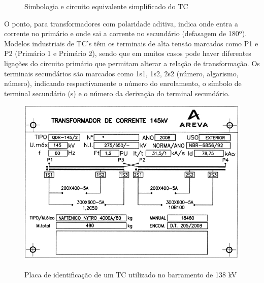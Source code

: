 \documentclass[a5paper]{ufsc-thesis}
\begin{document}
\begin{figure}[htb]
  \caption{Simbologia e circuito equivalente simplificado do TC}
  \label{fig:tca}
  \centering
\end{figure}\par
O ponto, para transformadores com polaridade aditiva, indica onde entra a corrente no primário e onde sai a corrente no secundário (defasagem de 180º). Modelos industriais de TC’s têm os terminais de alta tensão marcados como P1 e P2 (Primário 1 e Primário 2), sendo que em muitos casos pode haver diferentes ligações do circuito primário que permitam alterar a relação de transformação. Os terminais secundários são marcados como 1s1, 1s2, 2s2 (número, algarismo, número), indicando respectivamente o número do enrolamento, o símbolo de terminal secundário (s) e o número da derivação do terminal secundário.\par
\begin{figure}[htb]
  \caption{Placa de identificação de um TC utilizado no barramento de 138 kV}
  \centering
  \includegraphics[width=13cm]{placatc.jpg}
  \label{fig:placatc}
\end{figure}
\end{document}
